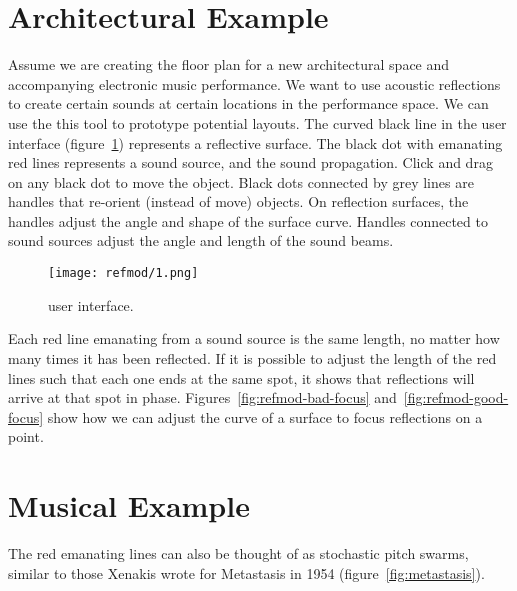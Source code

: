 \section{ Architectural Example}
\label{sec:refmod-user-interf}
Assume we are creating the floor plan for a new architectural space
and accompanying electronic music performance. We want to use acoustic
reflections to create certain sounds at certain locations in the
performance space. We can use the this tool to prototype potential
layouts. The curved black line in the user interface
(figure~\ref{fig:refmod-simple}) represents a reflective surface. The
black dot with emanating red lines represents a sound source, and the
sound propagation. Click and drag on any black dot to move the
object. Black dots connected by grey lines are handles that
re-orient (instead of move) objects. On reflection surfaces, the handles
adjust the angle and shape of the surface curve. Handles connected to
sound sources adjust the angle and length of the sound beams. 
\begin{figure}[]
  \texttt{[image: refmod/1.png]}
  \caption[]{ user interface.}
  \label{fig:refmod-simple}
\end{figure}
Each red line emanating from a sound source is the same length, no
matter how many times it has been reflected. If it is possible to
adjust the length of the red lines such that each one ends at the same
spot, it shows that reflections will arrive at that spot in
phase. Figures~\ref{fig:refmod-bad-focus}
and~\ref{fig:refmod-good-focus} show how we can adjust the curve of a
surface to focus reflections on a point.

\section{ Musical Example}
\label{sec:refm-music-example}
The red emanating lines can also be thought of as stochastic pitch
swarms, similar to those Xenakis wrote for Metastasis in 1954
(figure~\ref{fig:metastasis}).

